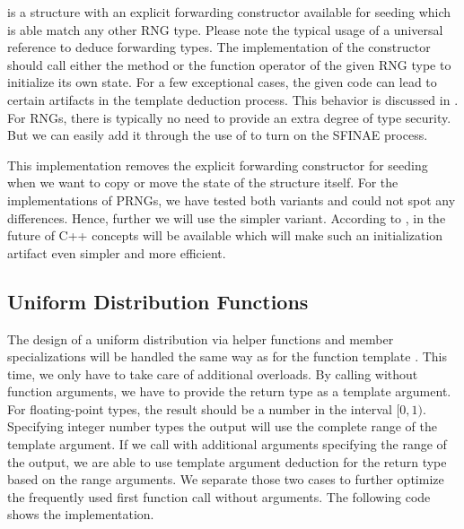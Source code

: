 \documentclass{stdlocal}
\begin{document}
     is a structure with an explicit forwarding constructor available for seeding which is able match any other RNG type.
    Please note the typical usage of a universal reference to deduce forwarding types.
    The implementation of the constructor should call either the  method or the function operator of the given RNG type to initialize its own state.
    For a few exceptional cases, the given code can lead to certain artifacts in the template deduction process.
    This behavior is discussed in \textcite[\ppno~188-197]{meyers2014}.
    For RNGs, there is typically no need to provide an extra degree of type security.
    But we can easily add it through the use of  to turn on the SFINAE process.

    This implementation removes the explicit forwarding constructor for seeding when we want to copy or move the state of the structure itself.
    For the implementations of PRNGs, we have tested both variants and could not spot any differences.
    Hence, further we will use the simpler variant.
    According to \textcite{vandevoorde2018}, in the future of C++ concepts will be available which will make such an initialization artifact even simpler and more efficient.

  \subsection{Uniform Distribution Functions} %
  \label{sub:distributions}
    The design of a uniform distribution  via helper functions and member specializations will be handled the same way as for the function template .
    This time, we only have to take care of additional overloads.
    By calling  without function arguments, we have to provide the return type as a template argument.
    For floating-point types, the result should be a number in the interval $[0,1)$.
    Specifying integer number types the output will use the complete range of the template argument.
    If we call  with additional arguments specifying the range of the output, we are able to use template argument deduction for the return type based on the range arguments.
    We separate those two cases to further optimize the frequently used first function call without arguments.
    The following code shows the implementation.
\end{document}
